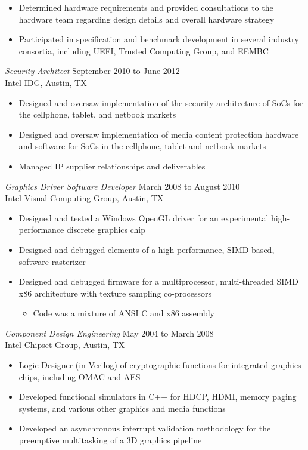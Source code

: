 \documentclass[overlapped]{res}
\begin{document}
\begin{resume}
\begin{itemize}
	\item Determined hardware requirements and provided consultations to the hardware team regarding design details and overall hardware strategy
	\item Participated in specification and benchmark development in several industry consortia, including UEFI, Trusted Computing Group, and EEMBC
\end{itemize}
{\sl Security Architect} \hfill September 2010 to June 2012 \\
	Intel IDG, Austin, TX
\begin{itemize}
	\item Designed and oversaw implementation of the security architecture of SoCs for the cellphone, tablet, and netbook markets
	\item Designed and oversaw implementation of media content protection hardware and software for SoCs in the cellphone, tablet and netbook markets
	\item Managed IP supplier relationships and deliverables
\end{itemize}
{\sl Graphics Driver Software Developer} \hfill March 2008 to August 2010 \\
	Intel Visual Computing Group, Austin, TX
\begin{itemize}
	\item Designed and tested a Windows OpenGL driver for an experimental high-performance discrete graphics chip
	\item Designed and debugged elements of a high-performance, SIMD-based, software rasterizer
	\item Designed and debugged firmware for a multiprocessor, multi-threaded SIMD x86 architecture with texture sampling co-processors
	\begin{itemize}
		\item Code was a mixture of ANSI C and x86 assembly
	\end{itemize}
\end{itemize}
{\sl Component Design Engineering} \hfill May 2004 to March 2008 \\
	Intel Chipset Group, Austin, TX
\begin{itemize}
	\item Logic Designer (in Verilog) of cryptographic functions for integrated graphics chips, including OMAC and AES
	\item Developed functional simulators in C++ for HDCP, HDMI, memory paging systems, and various other graphics and media functions
	\item Developed an asynchronous interrupt validation methodology for the preemptive multitasking of a 3D graphics pipeline

\end{itemize}
\end{resume}
\end{document}
